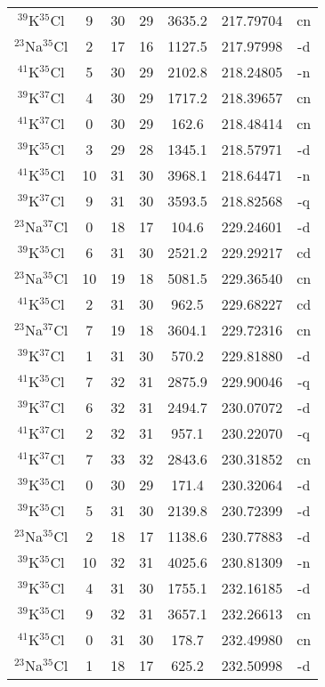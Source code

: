 \begin{table*}[htp]
\begin{tabular}{ccccccc}
$^{39}$K$^{35}$Cl & 9 & 30 & 29 & 3635.2 & 217.79704 & cn \\
$^{23}$Na$^{35}$Cl & 2 & 17 & 16 & 1127.5 & 217.97998 & -d \\
$^{41}$K$^{35}$Cl & 5 & 30 & 29 & 2102.8 & 218.24805 & -n \\
$^{39}$K$^{37}$Cl & 4 & 30 & 29 & 1717.2 & 218.39657 & cn \\
$^{41}$K$^{37}$Cl & 0 & 30 & 29 & 162.6 & 218.48414 & cn \\
$^{39}$K$^{35}$Cl & 3 & 29 & 28 & 1345.1 & 218.57971 & -d \\
$^{41}$K$^{35}$Cl & 10 & 31 & 30 & 3968.1 & 218.64471 & -n \\
$^{39}$K$^{37}$Cl & 9 & 31 & 30 & 3593.5 & 218.82568 & -q \\
$^{23}$Na$^{37}$Cl & 0 & 18 & 17 & 104.6 & 229.24601 & -d \\
$^{39}$K$^{35}$Cl & 6 & 31 & 30 & 2521.2 & 229.29217 & cd \\
$^{23}$Na$^{35}$Cl & 10 & 19 & 18 & 5081.5 & 229.36540 & cn \\
$^{41}$K$^{35}$Cl & 2 & 31 & 30 & 962.5 & 229.68227 & cd \\
$^{23}$Na$^{37}$Cl & 7 & 19 & 18 & 3604.1 & 229.72316 & cn \\
$^{39}$K$^{37}$Cl & 1 & 31 & 30 & 570.2 & 229.81880 & -d \\
$^{41}$K$^{35}$Cl & 7 & 32 & 31 & 2875.9 & 229.90046 & -q \\
$^{39}$K$^{37}$Cl & 6 & 32 & 31 & 2494.7 & 230.07072 & -d \\
$^{41}$K$^{37}$Cl & 2 & 32 & 31 & 957.1 & 230.22070 & -q \\
$^{41}$K$^{37}$Cl & 7 & 33 & 32 & 2843.6 & 230.31852 & cn \\
$^{39}$K$^{35}$Cl & 0 & 30 & 29 & 171.4 & 230.32064 & -d \\
$^{39}$K$^{35}$Cl & 5 & 31 & 30 & 2139.8 & 230.72399 & -d \\
$^{23}$Na$^{35}$Cl & 2 & 18 & 17 & 1138.6 & 230.77883 & -d \\
$^{39}$K$^{35}$Cl & 10 & 32 & 31 & 4025.6 & 230.81309 & -n \\
$^{39}$K$^{35}$Cl & 4 & 31 & 30 & 1755.1 & 232.16185 & -d \\
$^{39}$K$^{35}$Cl & 9 & 32 & 31 & 3657.1 & 232.26613 & cn \\
$^{41}$K$^{35}$Cl & 0 & 31 & 30 & 178.7 & 232.49980 & cn \\
$^{23}$Na$^{35}$Cl & 1 & 18 & 17 & 625.2 & 232.50998 & -d \\

\end{tabular}
\end{table*}
